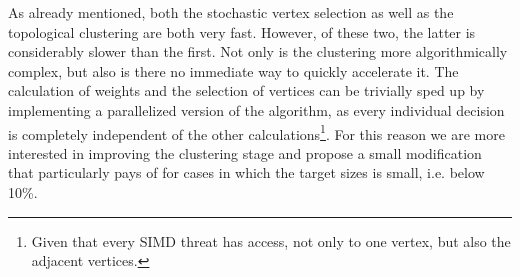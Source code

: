 As already mentioned, both the stochastic vertex selection as well as the topological clustering are both very fast.
However, of these two, the latter is considerably slower than the first.
Not only is the clustering more algorithmically complex, but also is there no immediate way to quickly accelerate it.
The calculation of weights and the selection of vertices can be trivially sped up by implementing a parallelized version of the algorithm, as every individual decision is completely independent of the other calculations\footnote{ Given that every SIMD threat has access, not only to one vertex, but also the adjacent vertices.}.
For this reason we are more interested in improving the clustering stage and propose a small modification that particularly pays of for cases in which the target sizes is small, i.e. below 10\%.

